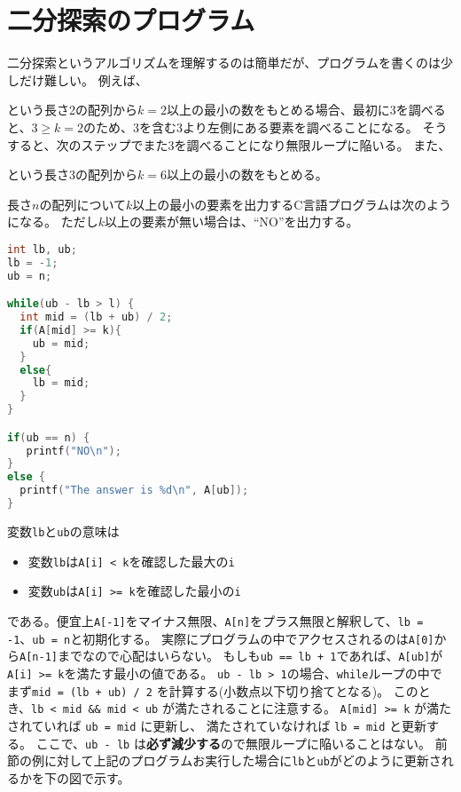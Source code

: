 \documentclass[a4paper,twoside,onecolumn,openany,article,10pt]{memoir}
\theoremstyle{remark}
\begin{document}
\section{二分探索のプログラム}
二分探索というアルゴリズムを理解するのは簡単だが、プログラムを書くのは少しだけ難しい。
例えば、
\begin{center}
\end{center}
という長さ2の配列から$k=2$以上の最小の数をもとめる場合、最初に3を調べると、$3\ge k=2$のため、3を含む3より左側にある要素を調べることになる。
そうすると、次のステップでまた3を調べることになり無限ループに陥いる。
また、
\begin{center}
\end{center}
という長さ3の配列から$k=6$以上の最小の数をもとめる。
\fi

長さ$n$の配列について$k$以上の最小の要素を出力するC言語プログラムは次のようになる。
ただし$k$以上の要素が無い場合は、``NO''を出力する。

\begin{lstlisting}[basicstyle=\ttfamily\small,showstringspaces=false,language=C,frame=single]
int lb, ub;
lb = -1;
ub = n;

while(ub - lb > l) {
  int mid = (lb + ub) / 2;
  if(A[mid] >= k){
    ub = mid;
  }
  else{
    lb = mid;
  }
}

if(ub == n) {
   printf("NO\n");
}
else {
  printf("The answer is %d\n", A[ub]);
}
\end{lstlisting}
変数\texttt{lb}と\texttt{ub}の意味は
\begin{itemize}
\item 変数\texttt{lb}は\texttt{A[i] < k}を確認した最大の\texttt{i}
\item 変数\texttt{ub}は\texttt{A[i] >= k}を確認した最小の\texttt{i}
\end{itemize}
である。便宜上\texttt{A[-1]}をマイナス無限、\texttt{A[n]}をプラス無限と解釈して、\texttt{lb = -1}、\texttt{ub = n}と初期化する。
実際にプログラムの中でアクセスされるのは\texttt{A[0]}から\texttt{A[n-1]}までなので心配はいらない。
もしも\texttt{ub == lb + 1}であれば、\texttt{A[ub]}が\texttt{A[i] >= k}を満たす最小の値である。
\texttt{ub - lb > 1}の場合、\texttt{while}ループの中でまず\texttt{mid = (lb + ub) / 2} を計算する(小数点以下切り捨てとなる)。
このとき、\texttt{lb < mid \&\& mid < ub} が満たされることに注意する。
\texttt{A[mid] >= k} が満たされていれば \texttt{ub = mid} に更新し、
満たされていなければ \texttt{lb = mid} と更新する。
ここで、\texttt{ub - lb} は\textbf{必ず減少する}ので無限ループに陥いることはない。
前節の例に対して上記のプログラムお実行した場合に\texttt{lb}と\texttt{ub}がどのように更新されるかを下の図で示す。
\end{document}
